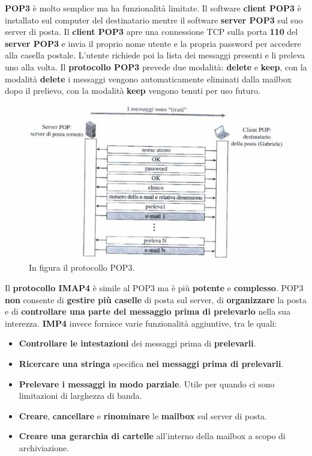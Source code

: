 \documentclass[11pt,a4paper]{article}
\theoremstyle{definition}
\begin{document}
\textbf{POP3} è molto semplice ma ha funzionalità limitate. Il software \textbf{client POP3 } è installato sul computer del destinatario mentre il software \textbf{server POP3 }sul suo server di posta. Il \textbf{client POP3} apre una connessione TCP sulla porta \textbf{110} del \textbf{server POP3} e invia il proprio nome utente e la propria password per accedere alla casella postale. L'utente richiede poi la lista dei messaggi presenti e li preleva uno alla volta.
\newpage
Il \textbf{protocollo POP3} prevede due modalità: \textbf{delete} e \textbf{keep}, con la modalità \textbf{delete} i messaggi vengono automaticamente eliminati dalla mailbox dopo il prelievo, con la modalità \textbf{keep} vengono tenuti per uso futuro.
\begin{figure}[!h]
	\includegraphics[scale=0.6]{Immagini/POP3.png}
	\centering
	\caption{In figura il protocollo POP3.}
\end{figure}\newline
Il \textbf{protocollo IMAP4} è simile al POP3 ma è più \textbf{potente} e \textbf{complesso}. POP3 \textbf{non} consente di \textbf{gestire più caselle }di posta sul server, di \textbf{organizzare} la posta e di \textbf{controllare una parte del messaggio prima di prelevarlo} nella sua interezza. \textbf{IMP4} invece fornisce varie funzionalità aggiuntive, tra le quali:
\begin{itemize}
	\item \textbf{Controllare le intestazioni} dei messaggi prima di \textbf{prelevarli}.
	\item \textbf{Ricercare una stringa} specifica \textbf{nei messaggi prima di prelevarli}.
	\item \textbf{Prelevare i messaggi in modo parziale}. Utile per quando ci sono limitazioni di larghezza di banda.
	\item \textbf{Creare}, \textbf{cancellare} e \textbf{rinominare} le \textbf{mailbox} sul server di posta.
	\item \textbf{Creare una gerarchia di cartelle} all'interno della mailbox a scopo di archiviazione.
\end{itemize}
\end{document}
